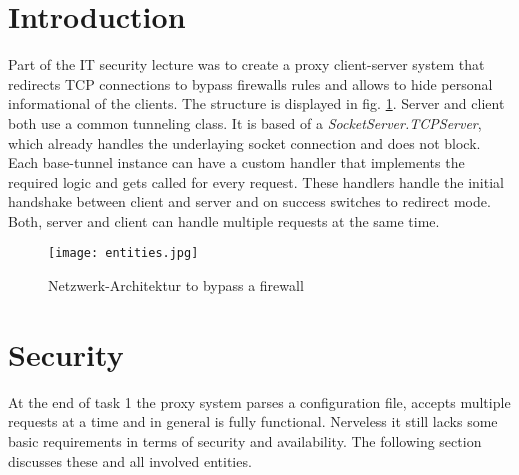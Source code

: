 \documentclass[12pt, a4paper]{scrartcl}
\begin{document}


\tableofcontents
\newpage
{}
\setcounter{lastroman}{\value{page}}

\pagestyle{plain}
\maketitle

\section{Introduction}
Part of the IT security lecture was to create a proxy client-server system that redirects TCP connections to bypass firewalls rules and allows to hide personal informational of the clients. The structure is displayed in fig. \ref{fig::arch}. \newline
Server and client both use a common tunneling class. It is based of a \textit{SocketServer.TCPServer}, which already handles the underlaying socket connection and does not block. Each base-tunnel instance can have a custom handler that implements the required logic and gets called for every request. These handlers handle the initial handshake between client and server and on success switches to redirect mode. Both, server and client can handle multiple requests at the same time.

\begin{figure}[H]
    \centering
    \texttt{[image: entities.jpg]}
    \caption{Netzwerk-Architektur to bypass a firewall}
    \label{fig::arch}
\end{figure}

\newpage
\section{Security}
At the end of task 1 the proxy system parses a configuration file, accepts multiple requests at a time and in general is fully functional. Nerveless it still lacks some basic requirements in terms of security and availability. The following section discusses these and all involved entities.
\end{document}
